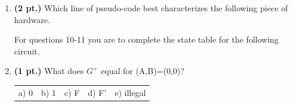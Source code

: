 \documentclass{article}
\begin{document}
\begin{enumerate}
\pagebreak
\item {\bf (2 pt.)} Which line of pseudo-code best characterizes
the following piece of hardware.




For questions 10-11 you are to complete the state table 
for the following circuit.


\item {\bf (1 pt.)} What does $G^+$ equal for (A,B)=(0,0)?

\begin{tabular}{p{0.6in} p{0.6in} p{0.6in} p{0.6in} l}
a) 0 & b) 1 & c) F & d) F' & e) illegal
\end{tabular}


\end{enumerate}
\end{document}
